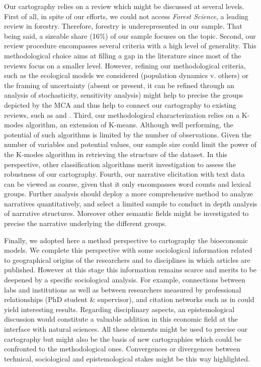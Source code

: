 Our cartography relies on a review which might be discussed at several levels. First of all, in spite of our efforts, we could not access \textit{Forest Science}, a leading review in forestry. Therefore, forestry is underepresented in our sample. That being said, a sizeable share (16\%) of our sample focuses on the topic.
Second, our review procedure encompasses several criteria with a high level of generality. This methodological choice aims at filling a gap in the literature since most of the reviews focus on a smaller level. However, refining our methodological criteria, such as the ecological models we considered (population dynamics v. others) or the framing of uncertainty (absent or present, it can be refined through an analysis of stochasticity, sensitivity analysis) might help to precise the groups depicted by the MCA and thus help to connect our cartography to existing reviews, such as \cite{Eppink2007} and \cite{Castro2018}.
Third, our methodological characterization relies on a K-modes algorithm, an extension of K-means. Although well performing, the potential of such algorithms is limited by the number of observations. Given the number of variables and potential values, our sample size could limit the power of the K-modes algorithm in retrieving the structure of the dataset. In this perspective, other classification algorithms merit investigation to assess the robustness of our cartography. 
Fourth, our narrative elicitation with text data can be viewed as coarse, given that it only encompasses word counts and lexical groups. Further analysis should deploy a more comprehensive method to analyze narratives quantitatively, and select a limited sample to conduct in depth analysis of narrative structures. Moreover other semantic fields might be investigated to precise the narrative underlying the different groups. 

Finally, we adopted here a method perspective to cartography the bioeconomic models. We complete this perspective with some sociological information related to geographical origins of the researchers and to disciplines in which articles are published. However at this stage this information remains scarce and merits to be deepened by a specific sociological analysis. For example, connections between labs and institutions as well as between researchers measured by professional relationships (PhD student \& supervisor), and citation networks such as in \cite{Smessaert2020} could yield interesting results. Regarding disciplinary aspects, an epistemological discussion would constitute a valuable addition in this economic field at the interface with natural sciences. All these elements might be used to precise our cartography but might also be the basis of new cartographies which could be confronted to the methodological ones. Convergences or divergences between technical, sociological and epistemological stakes might be this way highlighted.


